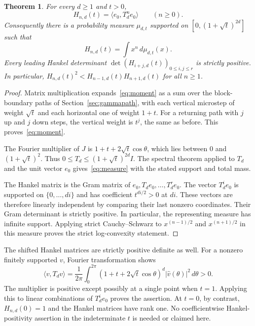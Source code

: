 \documentclass[11pt]{article}
\numberwithin{equation}{section}
\newtheorem{theorem}{Theorem}[section]
\theoremstyle{definition}
\begin{document}
\begin{theorem}
\label{thm:moment}
For every $d\geq1$ and $t>0$,
\begin{equation}
 H_{n,d}(t)=\langle e_0,T_d^n e_0\rangle\qquad(n\geq0).
 \label{eq:moment}
\end{equation}
Consequently there is a probability measure $\mu_{d,t}$ supported on
$[0,(1+\sqrt t)^{2d}]$ such that
\begin{equation}
 H_{n,d}(t)=\int x^n\,d\mu_{d,t}(x).
 \label{eq:measure}
\end{equation}
Every leading Hankel determinant
$\det(H_{i+j,d}(t))_{0\leq i,j\leq r}$ is strictly positive. In particular,
$H_{n,d}(t)^2<H_{n-1,d}(t)H_{n+1,d}(t)$ for all $n\geq1$.
\end{theorem}
\begin{proof}
Matrix multiplication expands~\eqref{eq:moment} as a sum over the
block-boundary paths of Section~\ref{sec:gammapath}, with each vertical
microstep of weight $\sqrt t$ and each horizontal one of weight $1+t$.
For a returning path with $j$ up and $j$ down steps, the vertical weight is
$t^j$, the same as before. This proves~\eqref{eq:moment}.

The Fourier multiplier of $J$ is
$1+t+2\sqrt t\cos\theta$, which lies between $0$ and $(1+\sqrt t)^2$.
Thus $0\leq T_d\leq(1+\sqrt t)^{2d}I$. The spectral theorem applied to
$T_d$ and the unit vector $e_0$ gives~\eqref{eq:measure} with the stated
support and total mass.

The Hankel matrix is the Gram matrix of
$e_0,T_de_0,\ldots,T_d^re_0$. The vector $T_d^i e_0$ is supported on
$\{0,\ldots,di\}$ and has coefficient $t^{di/2}>0$ at $di$.
These vectors are therefore linearly independent by comparing their last
nonzero coordinates. Their Gram determinant is strictly positive.
In particular, the representing measure has infinite support. Applying strict
Cauchy--Schwarz to $x^{(n-1)/2}$ and $x^{(n+1)/2}$ in this measure proves
the strict log-convexity statement.
\end{proof}

The shifted Hankel matrices are strictly positive definite as well.
For a nonzero finitely supported $v$, Fourier transformation shows
\[
 \langle v,T_dv\rangle
 =\frac1{2\pi}\int_0^{2\pi}
 (1+t+2\sqrt t\cos\theta)^d|\widehat v(\theta)|^2\,d\theta>0.
\]
The multiplier is positive except possibly at a single point when $t=1$.
Applying this to linear combinations of $T_d^ie_0$ proves the assertion.
At $t=0$, by contrast, $H_{n,d}(0)=1$ and the Hankel matrices have rank one.
No coefficientwise Hankel-positivity assertion in the indeterminate $t$ is
needed or claimed here.
\end{document}
